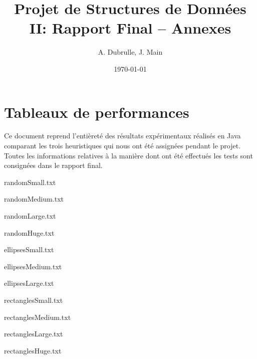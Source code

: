 \documentclass[a4paper, 12pt]{article}
\title{Projet de Structures de Données II: Rapport Final -- Annexes}
\author{A. Dubrulle, J. Main}
\date{\today}
\theoremstyle{definition} \newtheorem{df}{D\'{e}finition}[section]
\theoremstyle{definition} \newtheorem{ex}[df]{Exemple}
\theoremstyle{definition} \newtheorem{thm}[df]{Th\'{e}or\`{e}me}
\theoremstyle{definition} \newtheorem{cor}[df]{Corollaire}
\theoremstyle{definition} \newtheorem{lem}[df]{Lemme}
\theoremstyle{definition} \newtheorem{obs}[df]{Observation}
\theoremstyle{definition} \newtheorem{prop}[df]{Proposition}
\theoremstyle{definition} \newtheorem{rem}[df]{Remarque}
\begin{document}
\maketitle
\section*{Tableaux de performances}
Ce document reprend l'entièreté des résultats expérimentaux
réalisés en Java comparant les trois heuristiques qui nous ont été assignées
pendant le projet. Toutes les informations relatives à la manière
dont ont été effectués les tests sont consignées dans le rapport final.

\begin{table}[h]
\caption{randomSmall.txt}

\end{table}

\begin{table}[h]
\caption{randomMedium.txt}

\end{table}

\begin{table}[h]
\caption{randomLarge.txt}

\end{table}

\begin{table}[h]
\caption{randomHuge.txt}

\end{table}


\begin{table}[h]
\caption{ellipsesSmall.txt}

\end{table}

\begin{table}[h]
\caption{ellipsesMedium.txt}

\end{table}

\begin{table}[h]
\caption{ellipsesLarge.txt}

\end{table}

\begin{table}[h]
\caption{rectanglesSmall.txt}

\end{table}

\begin{table}[h]
\caption{rectanglesMedium.txt}

\end{table}

\begin{table}[h]
\caption{rectanglesLarge.txt}

\end{table}

\begin{table}[h]
\caption{rectanglesHuge.txt}

\end{table}
\end{document}
